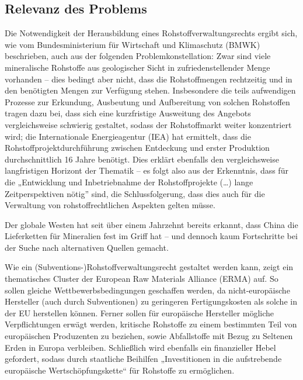\documentclass[12pt,a4paper,oneside]{book} %
\begin{document}
	\subsection{Relevanz des Problems}
	Die Notwendigkeit der Herausbildung eines Rohstoffverwaltungsrechts ergibt sich, wie vom Bundesministerium für Wirtschaft und Klimaschutz (BMWK) beschrieben,\autocite{bundesministerium_fur_wirtschaft_und_klimaschutz_bmwk_industriepolitik_2023} auch aus der folgenden Problemkonstellation: Zwar sind viele mineralische Rohstoffe aus geologischer Sicht in zufriedenstellender Menge vorhanden – dies bedingt aber nicht, dass die Rohstoffmengen rechtzeitig und in den benötigten Mengen zur Verfügung stehen. Insbesondere die teils aufwendigen Prozesse zur Erkundung, Ausbeutung und Aufbereitung von solchen Rohstoffen tragen dazu bei, dass sich eine kurzfristige Ausweitung des Angebots vergleichsweise schwierig gestaltet, sodass der Rohstoffmarkt weiter konzentriert wird; die Internationale Energieagentur (IEA) hat ermittelt, dass die Rohstoffprojektdurchführung zwischen Entdeckung und erster Produktion durchschnittlich 16 Jahre benötigt.\autocite[12]{international_energy_agency_role_2021} Dies erklärt ebenfalls den vergleichsweise langfristigen Horizont der Thematik – es folgt also aus der Erkenntnis, dass für die „Entwicklung und Inbetriebnahme der Rohstoffprojekte (…) lange Zeitperspektiven nötig” sind,\autocite[13]{bundesministerium_fur_wirtschaft_und_klimaschutz_bmwk_industriepolitik_2023} die Schlussfolgerung, dass dies auch für die Verwaltung von rohstoffrechtlichen Aspekten gelten müsse.
	
	Der globale Westen hat seit über einem Jahrzehnt bereits erkannt, dass China die Lieferketten für Mineralien fest im Griff hat -- und dennoch kaum Fortschritte bei der Suche nach alternativen Quellen gemacht.
	
	Wie ein (Subventions-)Rohstoffverwaltungsrecht gestaltet werden kann, zeigt ein thematisches Cluster der European Raw Materials Alliance (ERMA) auf. So sollen gleiche Wettbewerbsbedingungen geschaffen werden, da nicht-europäische Hersteller (auch durch Subventionen) zu geringeren Fertigungskosten als solche in der EU herstellen können. Ferner sollen für europäische Hersteller mögliche Verpflichtungen erwägt werden, kritische Rohstoffe zu einem bestimmten Teil von europäischen Produzenten zu beziehen, sowie Abfallstoffe mit Bezug zu Seltenen Erden in Europa verbleiben. Schließlich wird ebenfalls ein finanzieller Hebel gefordert, sodass durch staatliche Beihilfen „Investitionen in die aufstrebende europäische Wertschöpfungskette“ für Rohstoffe zu ermöglichen.\autocite[7]{gaus_rare_2021}
	
\end{document}
